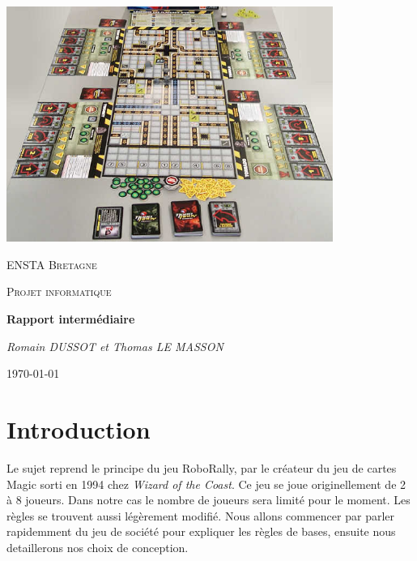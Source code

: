 \documentclass[a4paper,12pt]{report}
\begin{document}
\begin{titlepage}
\center
\includegraphics[width=0.8\textwidth]{Images/RoborallyPPage}\par\vspace{1cm}
	{\scshape\LARGE ENSTA Bretagne \par}
	\vspace{1cm}
	{\scshape\huge Projet informatique \par}
	\vspace{1cm}
	{\large\bfseries Rapport intermédiaire\par}
	\vspace{1cm}
	{\Large\itshape Romain DUSSOT et Thomas LE MASSON \par}

	\vfill
	{\large \today\par}
\end{titlepage}






	\chapter*{Introduction}

Le sujet reprend le principe du jeu RoboRally, par le créateur du jeu de cartes Magic sorti en 1994 chez \textit{Wizard of the Coast}. Ce jeu se joue originellement de 2 à 8 joueurs. Dans notre cas le nombre de joueurs sera limité pour le moment. Les règles se trouvent aussi légèrement modifié. Nous allons commencer par parler rapidemment du jeu de société pour expliquer les règles de bases, ensuite nous detaillerons nos choix de conception.

\end{document}
